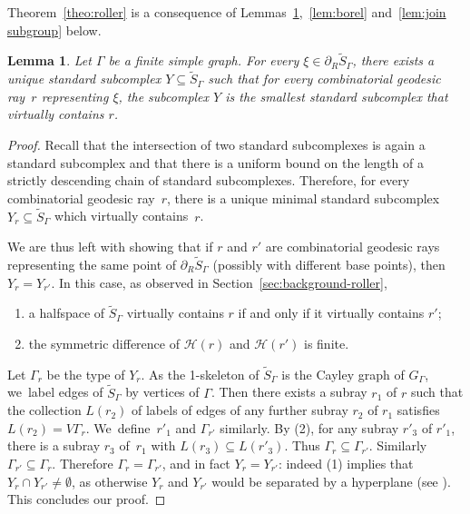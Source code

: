 \documentclass[11pt]{article}
\numberwithin{equation}{section}
\let\mathcal\mathscr
\theoremstyle{plain}
\newtheorem{lemma}[theo]{Lemma}
\theoremstyle{definition}
\begin{document}
Theorem~\ref{theo:roller} is a consequence of Lemmas~\ref{lemma:confined},~\ref{lem:borel} and~\ref{lem:join subgroup} below.

\begin{lemma}\label{lemma:confined}
Let $\Gamma$ be a finite simple graph. For every $\xi\in\partial_R\widetilde{S}_\Gamma$, there exists a unique standard subcomplex $Y\subseteq \widetilde{S}_\Gamma$ such that for every combinatorial geodesic ray~$r$ representing $\xi$, the subcomplex $Y$ is the smallest standard subcomplex that virtually contains $r$.
\end{lemma}

\begin{proof}
Recall that the intersection of two standard subcomplexes is again a standard subcomplex and that there is a uniform bound on the length of a strictly descending chain of standard subcomplexes. Therefore, for every combinatorial geodesic ray~$r$, there is a unique minimal standard subcomplex $Y_r\subseteq\widetilde{S}_\Gamma$ which virtually contains~$r$.

We are thus left with showing that if $r$ and $r'$ are combinatorial geodesic rays representing the same point of $\partial_R \widetilde{S}_\Gamma$ (possibly with different base points), then \hbox{$Y_r=Y_{r'}$}. In this case, as observed in Section~\ref{sec:background-roller},
\begin{enumerate}
\item[(1)] a halfspace of $\widetilde{S}_\Gamma$ virtually contains $r$ if and only if it virtually contains $r'$;
\item[(2)] the symmetric difference of $\mathcal{H}(r)$ and $\mathcal{H}(r')$ is finite.
\end{enumerate}
Let $\Gamma_r$ be the type of $Y_r$. As the 1-skeleton of $\widetilde{S}_\Gamma$ is the Cayley graph of $G_\Gamma$, we~label edges of $\widetilde{S}_\Gamma$ by vertices of $\Gamma$. Then there exists a subray $r_1$ of $r$ such that the collection $L(r_2)$ of labels of edges of any further subray $r_2$ of $r_1$ satisfies $L(r_2)=V\Gamma_r$. We~define~$r'_1$ and $\Gamma_{r'}$ similarly. By (2), for any subray $r'_3$ of $r'_1$, there is a subray $r_3$ of~$r_1$ with $L(r_3)\subseteq L(r'_3)$. Thus $\Gamma_r\subseteq \Gamma_{r'}$. Similarly $\Gamma_{r'}\subseteq \Gamma_r$. Therefore $\Gamma_r=\Gamma_{r'}$, and in fact $Y_r=Y_{r'}$: indeed (1) implies that $Y_r\cap Y_{r'}\neq\emptyset$, as otherwise $Y_r$ and $Y_{r'}$ would be separated by a hyperplane (see \cite[Cor.\,13.10]{haglund2008special}). This concludes our proof.
\end{proof}
\end{document}
